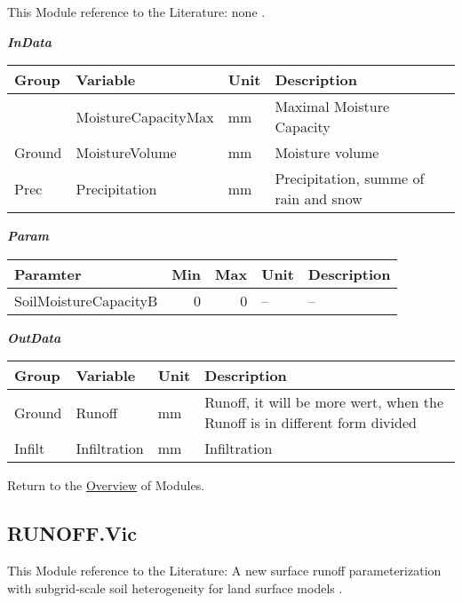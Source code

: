 \documentclass[
]{book}
\begin{document}
This Module reference to the Literature: none \citep{none}.

\textbf{\emph{InData}}

\begin{table}[!h]
\centering
\begin{tabular}{l|l|l|l}
\hline
Group & Variable & Unit & Description\\
\hline
 & MoistureCapacityMax & mm & Maximal Moisture Capacity\\
\cline{2-4}
\multirow{-2}{*}{\raggedright\arraybackslash Ground} & MoistureVolume & mm & Moisture volume\\
\cline{1-4}
Prec & Precipitation & mm & Precipitation, summe of rain and snow\\
\hline
\end{tabular}
\end{table}

\textbf{\emph{Param}}

\begin{table}[!h]
\centering
\begin{tabular}{l|r|r|l|l}
\hline
Paramter & Min & Max & Unit & Description\\
\hline
SoilMoistureCapacityB & 0 & 0 & -- & --\\
\hline
\end{tabular}
\end{table}

\textbf{\emph{OutData}}

\begin{table}[!h]
\centering
\begin{tabular}{l|l|l|l}
\hline
Group & Variable & Unit & Description\\
\hline
Ground & Runoff & mm & Runoff, it will be more wert, when the Runoff is in different form divided\\
\cline{1-4}
Infilt & Infiltration & mm & Infiltration\\
\hline
\end{tabular}
\end{table}

Return to the \protect\hyperlink{module}{Overview} of Modules.

\hypertarget{RUNOFF.Vic}{%
\subsection{RUNOFF.Vic}\label{RUNOFF.Vic}}

This Module reference to the Literature: A new surface runoff parameterization with subgrid-scale soil heterogeneity for land surface models \citep{Liang.2001}.
\end{document}

